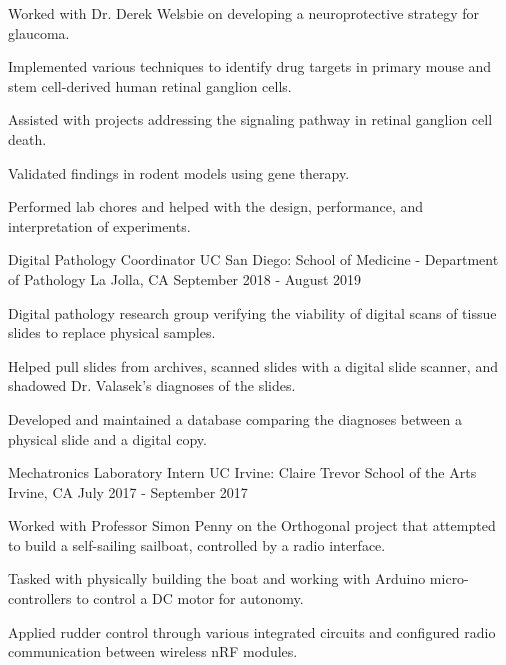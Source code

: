 \begin{cventries}
    {
      \begin{cvitems} %
        \item {Worked with Dr. Derek Welsbie on developing a neuroprotective strategy for glaucoma.}
        \item {Implemented various techniques to identify drug targets in primary mouse and stem cell-derived human retinal ganglion cells.}
        \item {Assisted with projects addressing the signaling pathway in retinal ganglion cell death.}
        \item {Validated findings in rodent models using gene therapy.}
        \item {Performed lab chores and helped with the design, performance, and interpretation of experiments.}
      \end{cvitems}
    }
  \cventry
    {Digital Pathology Coordinator} %
    {UC San Diego: School of Medicine - Department of Pathology} %
    {La Jolla, CA} %
    {September 2018 - August 2019} %
    {
      \begin{cvitems} %
        \item {Digital pathology research group verifying the viability of digital scans of tissue slides to replace physical samples.}
        \item {Helped pull slides from archives, scanned slides with a digital slide scanner, and shadowed Dr. Valasek’s diagnoses of the slides.}
        \item {Developed and maintained a database comparing the diagnoses between a physical slide and a digital copy.}
      \end{cvitems}
    }
 \cventry
    {Mechatronics Laboratory Intern} %
    {UC Irvine: Claire Trevor School of the Arts} %
    {Irvine, CA} %
    {July 2017 - September 2017} %
    {
      \begin{cvitems} %
        \item {Worked with Professor Simon Penny on the Orthogonal project that attempted to build a self-sailing sailboat, controlled by a radio interface.}
        \item {Tasked with physically building the boat and working with Arduino micro-controllers to control a DC motor for autonomy.}
        \item {Applied rudder control through various integrated circuits and configured radio communication between wireless nRF modules.}
      \end{cvitems}
    }
\end{cventries}
